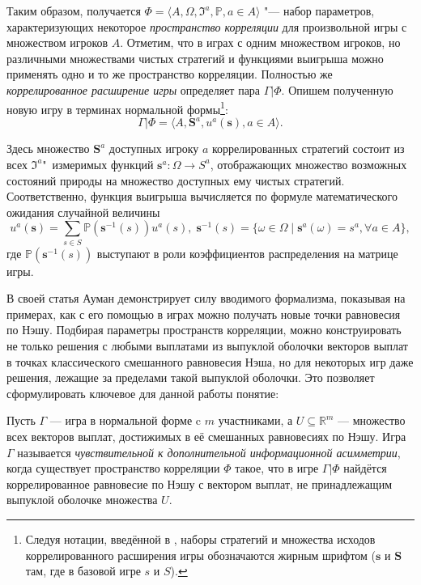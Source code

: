 Таким образом, получается $\Phi = \langle A, \Omega, \mathfrak{I}^a, \mathbb{P}, a \in A \rangle$ "--- набор параметров, характеризующих некоторое \emph{пространство корреляции} для произвольной игры с множеством игроков $A$. Отметим, что в играх с одним множеством игроков, но различными множествами чистых стратегий и функциями выигрыша можно применять одно и то же пространство корреляции. Полностью же \emph{коррелированное расширение игры} определяет пара $\Gamma | \Phi$. Опишем полученную новую игру в терминах нормальной формы\footnote{Следуя нотации, введённой в \cite{Aumann74}, наборы стратегий и множества исходов коррелированного расширения игры обозначаются жирным шрифтом ($\mathbf{s}$ и $\mathbf{S}$ там, где в базовой игре $s$ и $S$).}:
\begin{equation*}
	\Gamma | \Phi = \langle A, \mathbf{S}^a, u^a(\mathbf{s}), a \in A \rangle.
\end{equation*}

Здесь множество $\mathbf{S}^a$ доступных игроку $a$ коррелированных стратегий состоит из всех $\mathfrak{I}^a$"~измеримых функций $\mathbf{s}^a : \Omega \rightarrow S^a$, отображающих множество возможных состояний природы на множество доступных ему чистых стратегий. Соответственно, функция выигрыша вычисляется по формуле математического ожидания случайной величины
\begin{equation*}
	u^a(\mathbf{s}) = \sum\limits_{s \in S} \mathbb{P}(\mathbf{s}^{-1}(s)) u^a(s),\;\mathbf{s}^{-1}(s) = \{\omega \in \Omega \mid \mathbf{s}^a(\omega) = s^a, \forall a \in A\},
\end{equation*}
где $\mathbb{P}(\mathbf{s}^{-1}(s))$ выступают в роли коэффициентов распределения на матрице игры.

В своей статья Ауман демонстрирует силу вводимого формализма, показывая на примерах, как с его помощью в играх можно получать новые точки равновесия по Нэшу. Подбирая параметры пространств корреляции, можно конструировать не только решения с любыми выплатами из выпуклой оболочки векторов выплат в точках классического смешанного равновесия Нэша, но для некоторых игр даже решения, лежащие за пределами такой выпуклой оболочки. Это позволяет сформулировать ключевое для данной работы понятие:
\begin{definition}
	Пусть $\Gamma$ --- игра в нормальной форме c $m$ участниками, а $U \subseteq \mathbb{R}^m$ --- множество всех векторов выплат, достижимых в её смешанных равновесиях по Нэшу. Игра $\Gamma$ называется \emph{чувствительной к дополнительной информационной асимметрии}, когда существует пространство корреляции $\Phi$ такое, что в игре $\Gamma | \Phi$ найдётся коррелированное равновесие по Нэшу с вектором выплат, не принадлежащим выпуклой оболочке множества $U$.
\end{definition}

